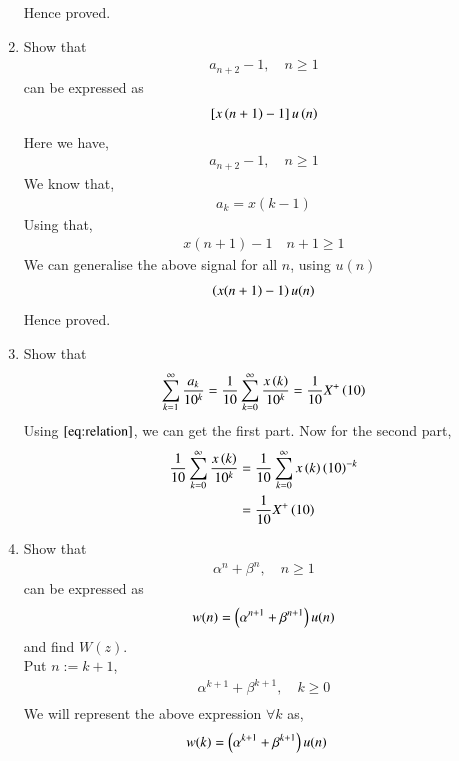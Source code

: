 \documentclass[journal,12pt,twocolumn]{IEEEtran}
\renewcommand\thesection{\arabic{section}}
\begin{document}
\begin{enumerate}[label=\thesection.\arabic*,ref=\thesection.\theenumi]
Hence proved.
\item Show that 
\begin{align}
a_{n+2}-1, \quad n \ge 1
\end{align}
can be expressed as 
\begin{align}
	{}\left[x\left(n+1\right)-1\right]u\left(n\right)
\end{align}
\solution Here we have, 
\begin{align}
a_{n+2}-1, \quad n \ge 1
\end{align}
We know that,
 \begin{align}
	 a_k = x(k - 1)\label{eq:relation}
 \end{align}
 Using that,
  \begin{align}
     x(n+1) - 1 \quad n+1 \geq 1
  \end{align}
  We can generalise the above signal for all $n$, using $u(n)$
   \begin{align}
	   \left(x(n+1) - 1\right)u(n)
   \end{align}
  Hence proved. \\
 \item Show that 
\begin{align}
	\sum_{k=1}^{\infty}\frac{a_k}{10^k}= 
	\frac{1}{10}\sum_{k=0}^{\infty}\frac{x\left(k\right)}{10^k} =\frac{1}{10}X^{+}\left(10\right)
\end{align}
\solution Using $\eqref{eq:relation}$, we can get the first part. Now for the second part,
 \begin{align}
	 \frac{1}{10}\sum_{k=0}^{\infty}\frac{x\left(k\right)}{10^k} &= \frac{1}{10}\sum_{k=0}^{\infty}x\left(k\right)\left(10\right)^{-k} \\
							       &= \frac{1}{10}X^{+}\left(10\right)
 \end{align}
  \item Show that 
\begin{align}
	\alpha^n + \beta^n, \quad n \ge 1
\end{align}
can be expressed as 
\begin{align}
	w(n) =\left(\alpha^{n+1} + \beta^{n+1}\right)u(n)
\end{align}
		and find $W(z)$.\\
 \solution Put $n:= k +1$,
  \begin{align}
	  \alpha^{k+1} + \beta^{k+1} , \quad k \ge 0 \\
  \end{align}
  We will represent the above expression $\forall k$ as,
   \begin{align}
	   w(k) &= \brak{\alpha^{k+1} + \beta^{k+1}}u(n)

\end{align}
\end{enumerate}
\end{document}
